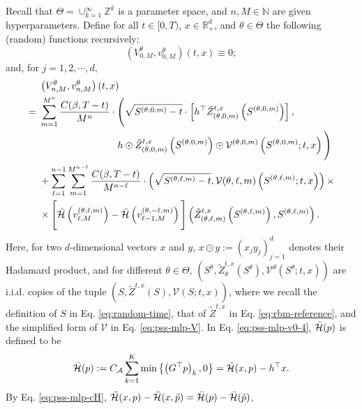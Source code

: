 \documentclass[11pt]{article}
\theoremstyle{definition}
\theoremstyle{plain}
\newcommand{\R}{\mathbb{R}}
\newcommand{\N}{\mathbb{N}}
\newcommand{\cH}{{\cal H}}
\newcommand{\Z}{\mathbb{Z}}
\begin{document}
Recall that $\Theta = \cup_{k=1}^{\infty} \Z^k$ is a parameter space, 
and $n, M \in \N$ are given hyperparameters.
Define for all $t \in [0, T)$, $x \in \R_+^d$, and $\theta \in \Theta$ 
the following (random) functions recursively:
\begin{equation}\label{eq:pss-mlp-v0}
\left(V^\theta_{0,M}, v^\theta_{0,M}\right)(t,x)\equiv 0;
\end{equation}
and, for $j = 1, 2, \cdots, d$, 
\begin{align}
&~\left(V^\theta_{n,M}, v^\theta_{n,M}\right)(t,x) \\
=&~\sum_{m=1}^{M^n} \frac{C(\beta, T-t)}{M^n} \cdot \Bigg(\sqrt{S^{(\theta,0,m)}-t} \cdot \left[h^\top \tilde Z^{t,x}_{(\theta, 0, m)} \left(S^{(\theta, 0, m)}\right)\right], \label{eq:pss-mlp-v0-1}\\
&~\qquad \qquad \qquad \qquad h \odot \tilde Z^{t,x}_{(\theta, 0, m)} \left(S^{(\theta, 0, m)}\right) \odot \mathcal{V}^{(\theta,0,m)}\left(S^{(\theta, 0, m)}; t,x\right)\Bigg) \label{eq:pss-mlp-v0-2}\\
&~+ \sum_{\ell=1}^{n-1} \sum_{m=1}^{M^{n-\ell}} 
\frac{C(\beta, T-t)}{M^{n-\ell}} \cdot \left(\sqrt{S^{(\theta, \ell, m)}-t}, \mathcal{V}{(\theta,\ell,m)}\left(S^{(\theta, \ell, m)}; t,x\right)\right)\times \label{eq:pss-mlp-v0-3}\\
&~\times \Bigg[\bar \cH \left(v^{(\theta, \ell, m)}_{\ell, M} \right)
 - \bar \cH \left(v^{(\theta, -\ell, m)}_{\ell-1, M} \right)\Bigg]\left(\tilde Z^{t,x}_{(\theta, \ell, m)} \left(S^{(\theta, \ell, m)}\right), S^{(\theta, \ell, m)}\right). \label{eq:pss-mlp-v0-4}
\end{align}
Here, for two $d$-dimensional vectors $x$ and $y$, 
$x \odot y := \left(x_jy_j\right)_{j=1}^d$ denotes their Hadamard product,  
and for different $\theta \in \Theta$, $\left(S^\theta, \tilde{Z}^{t,x}_\theta(S^\theta), \mathcal{V}^\theta(S^\theta; t,x)\right)$
are i.i.d. copies of the tuple $\left(S, \tilde{Z}^{t,x}(S), \mathcal{V}(S; t,x)\right)$, 
where we recall the definition of $S$ in Eq. \eqref{eq:random-time}, 
that of $\tilde{Z}^{t,x}$ in Eq. \eqref{eq:rbm-reference}, 
and the simplified form of $\mathcal{V}$ in Eq. \eqref{eq:pss-mlp-V}. 
In Eq. \eqref{eq:pss-mlp-v0-4}, $\bar \cH(p)$ is defined to be
\begin{equation}\label{eq:pss-mlp-cH-bar}
\bar \cH(p) := C_{\mathcal{A}} \sum_{k=1}^K \min\left\{\left(G^\top p\right)_k, 0\right\} = \tilde \cH (x, p) - h^\top x.
\end{equation}
By Eq. \eqref{eq:pss-mlp-cH}, 
$\tilde \cH (x, p) - \tilde \cH (x, \tilde{p}) = \bar \cH(p) - \bar \cH(\tilde{p})$, 
\end{document}
